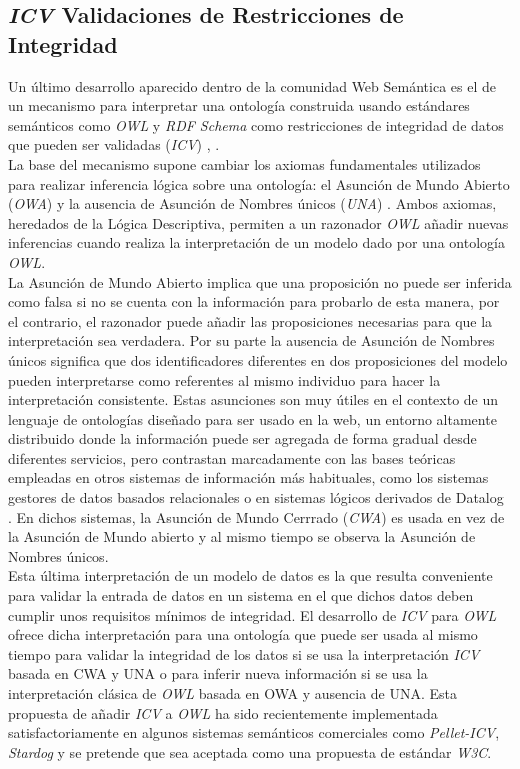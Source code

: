 \subsection{\textit{ICV} Validaciones de Restricciones de Integridad}

Un \'ultimo desarrollo aparecido dentro de la comunidad Web Sem\'antica es el de un mecanismo para interpretar una ontolog\'ia construida usando est\'andares sem\'anticos como \textit{OWL} y \textit{RDF Schema} como restricciones de integridad de datos que pueden ser validadas (\textit{ICV}) \cite{tao2010integrity}, \cite{motik2009bridging}.\\
La base del mecanismo supone cambiar los axiomas fundamentales utilizados para realizar inferencia l\'ogica sobre una ontolog\'ia: el Asunci\'on de Mundo Abierto (\textit{OWA}) y la ausencia de Asunci\'on de Nombres \'unicos (\textit{UNA}) \cite{sirin2008opening}. Ambos axiomas, heredados de la L\'ogica Descriptiva, permiten a un razonador \textit{OWL} a\~nadir nuevas inferencias cuando realiza la interpretaci\'on de un modelo dado por una ontolog\'ia \textit{OWL}.\\
La Asunci\'on de Mundo Abierto implica que una proposici\'on no puede ser inferida como falsa si no se cuenta con la informaci\'on para probarlo de esta manera, por el contrario, el razonador puede a\~nadir las proposiciones necesarias para que la interpretaci\'on sea verdadera. Por su parte la ausencia de Asunci\'on de Nombres \'unicos significa que dos identificadores diferentes en dos proposiciones del modelo pueden interpretarse como referentes al mismo individuo para hacer la interpretaci\'on consistente. Estas asunciones son muy \'utiles en el contexto de un lenguaje de ontolog\'ias dise\~nado para ser usado en la web, un entorno altamente distribuido donde la informaci\'on puede ser agregada de forma gradual desde diferentes servicios, pero contrastan marcadamente con las bases te\'oricas empleadas en otros sistemas de informaci\'on m\'as habituales, como los sistemas gestores de datos basados relacionales o en sistemas l\'ogicos derivados de Datalog \cite{motik2006can}. En dichos sistemas, la Asunci\'on de Mundo Cerrrado (\textit{CWA}) es usada en vez de la Asunci\'on de Mundo abierto y al mismo tiempo se observa la Asunci\'on de Nombres \'unicos.\\
Esta \'ultima interpretaci\'on de un modelo de datos es la que resulta conveniente para validar la entrada de datos en un sistema en el que dichos datos deben cumplir unos requisitos m\'inimos de integridad. El desarrollo de \textit{ICV} para \textit{OWL} ofrece dicha interpretaci\'on para una ontolog\'ia que puede ser usada al mismo tiempo para validar la integridad de los datos si se usa la interpretaci\'on \textit{ICV} basada en CWA y UNA o para inferir nueva informaci\'on si se usa la interpretaci\'on cl\'asica de \textit{OWL} basada en OWA y ausencia de UNA.
Esta propuesta de a\~nadir \textit{ICV} a \textit{OWL} ha sido recientemente implementada satisfactoriamente en algunos sistemas sem\'anticos comerciales como \textit{Pellet-ICV}, \textit{Stardog} y se pretende que sea aceptada como una propuesta de est\'andar \textit{W3C}.

